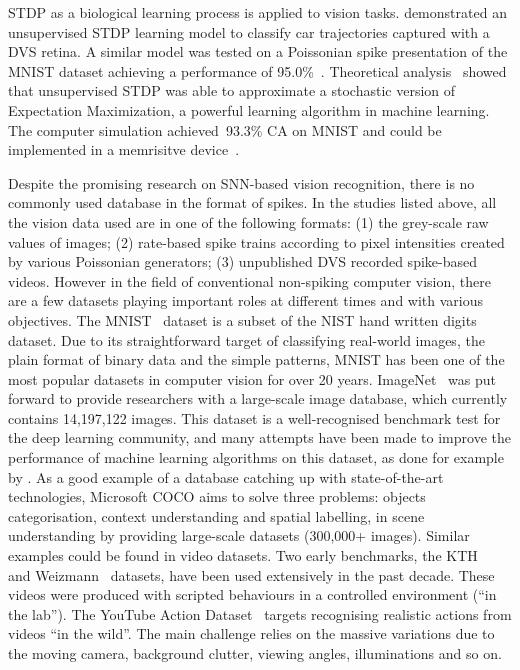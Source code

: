 \documentclass{frontiersENG} %
\begin{document}
STDP as a biological learning process is applied to vision tasks.
\cite{bichler2012extraction} demonstrated an unsupervised STDP learning model to classify car trajectories captured with a DVS retina. 
A similar model was tested on a Poissonian spike presentation of the MNIST dataset achieving a performance of 95.0\%~\citep{diehl2015unsupervised}.
Theoretical analysis~\citep{nessler2013bayesian} showed that unsupervised STDP was able to approximate a stochastic version of Expectation Maximization, a powerful learning algorithm in machine learning.
The computer simulation achieved~93.3\% CA on MNIST and could be implemented in a memrisitve device~\citep{bill2014compound}. 

Despite the promising research on SNN-based vision recognition, there is no commonly used database in the format of spikes.
In the studies listed above, all the vision data used are in one of the following formats:
(1) the grey-scale raw values of images;
(2) rate-based spike trains according to pixel intensities created by various Poissonian generators;
(3) unpublished DVS recorded spike-based videos.
However in the field of conventional non-spiking computer vision, there are a few datasets playing important roles at different times and with various objectives.
The MNIST~\citep{lecun1998gradient} dataset is a subset of the NIST hand written digits dataset.
Due to its straightforward target of classifying real-world images, the plain format of binary data and the simple patterns, MNIST has been one of the most popular datasets in computer vision for over 20 years.
ImageNet~\citep{deng2009imagenet} was put forward to provide researchers with a large-scale image database, which currently contains 14,197,122 images.
This dataset is a well-recognised benchmark test for the deep learning community, and many attempts have been made to improve the performance of machine learning algorithms on this dataset, as done for example by \citet{krizhevsky2012imagenet}.
As a good example of a database catching up with state-of-the-art technologies, Microsoft COCO aims to solve three problems: objects categorisation, context understanding and spatial labelling, in scene understanding by providing large-scale datasets (300,000+ images).
Similar examples could be found in video datasets.
Two early benchmarks, the KTH ~\citep{schuldt2004recognizing} and Weizmann~\citep{blank2005actions} datasets, have been used extensively in the past decade. 
These videos were produced with scripted behaviours in a controlled environment (``in the lab'').
The YouTube Action Dataset~\citep{liu2009recognizing} targets recognising realistic actions from videos ``in the wild''.
The main challenge relies on the massive variations due to the moving camera, background clutter, viewing angles, illuminations and so on.
\end{document}
